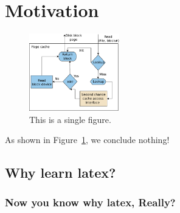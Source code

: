 \section{Motivation}

\begin{figure}
\centering
\includegraphics[width=0.35\textwidth]{images/cc_get}
 \caption{This is a single figure.}
 \label{fig:cc_get}
\end{figure}

As shown in Figure~\ref{fig:cc_get}, we conclude nothing!
\lipsum[50]
\subsection{Why learn latex?}
\lipsum[50]

\lipsum[50]


\lipsum[50]

\subsubsection{Now you know why latex, Really?}
\lipsum[50]

\lipsum[50]

